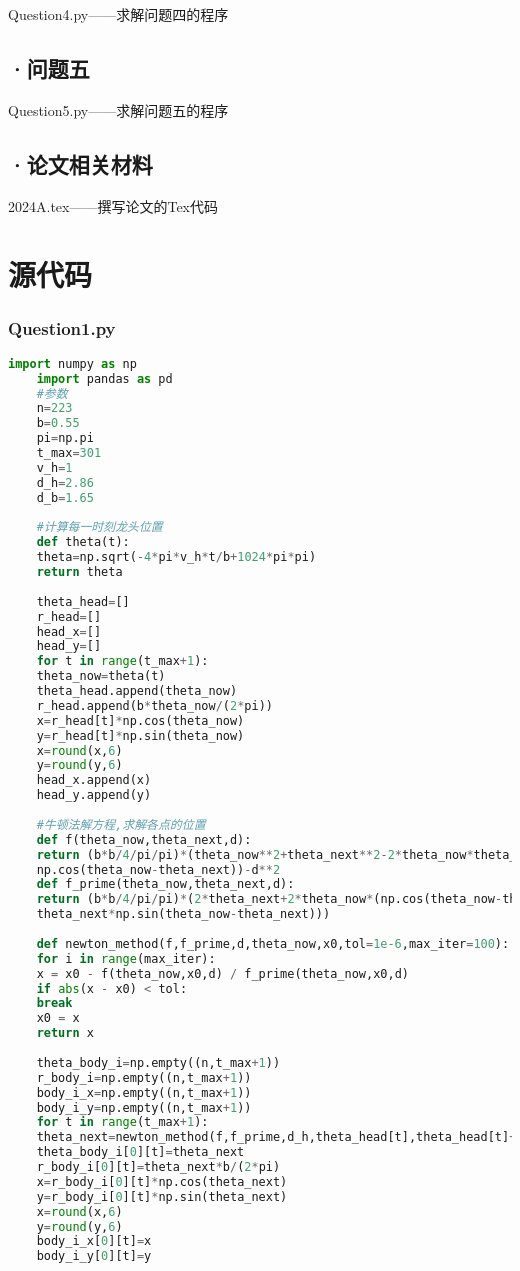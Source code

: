 \documentclass[withoutpreface,bwprint]{cumcmthesis} %
\begin{document}
	Question4.py——求解问题四的程序
	\subsection*{·问题五}
	Question5.py——求解问题五的程序
	\subsection*{·论文相关材料}
	2024A.tex——撰写论文的Tex代码
	\section{\quad 源代码}
	\subsubsection*{Question1.py}
	\begin{lstlisting}[language=Python]
	import numpy as np
	import pandas as pd
	#参数
	n=223
	b=0.55
	pi=np.pi
	t_max=301
	v_h=1
	d_h=2.86
	d_b=1.65
	
	#计算每一时刻龙头位置
	def theta(t):
	theta=np.sqrt(-4*pi*v_h*t/b+1024*pi*pi)
	return theta
	
	theta_head=[]
	r_head=[]
	head_x=[]
	head_y=[]
	for t in range(t_max+1):
	theta_now=theta(t)
	theta_head.append(theta_now)
	r_head.append(b*theta_now/(2*pi))
	x=r_head[t]*np.cos(theta_now)
	y=r_head[t]*np.sin(theta_now)
	x=round(x,6)
	y=round(y,6)
	head_x.append(x)
	head_y.append(y)
	
	#牛顿法解方程,求解各点的位置
	def f(theta_now,theta_next,d):
	return (b*b/4/pi/pi)*(theta_now**2+theta_next**2-2*theta_now*theta_next*
	np.cos(theta_now-theta_next))-d**2
	def f_prime(theta_now,theta_next,d):
	return (b*b/4/pi/pi)*(2*theta_next+2*theta_now*(np.cos(theta_now-theta_next)-
	theta_next*np.sin(theta_now-theta_next)))
	
	def newton_method(f,f_prime,d,theta_now,x0,tol=1e-6,max_iter=100):
	for i in range(max_iter):
	x = x0 - f(theta_now,x0,d) / f_prime(theta_now,x0,d)
	if abs(x - x0) < tol:
	break
	x0 = x
	return x
	
	theta_body_i=np.empty((n,t_max+1))
	r_body_i=np.empty((n,t_max+1))
	body_i_x=np.empty((n,t_max+1))
	body_i_y=np.empty((n,t_max+1))
	for t in range(t_max+1):
	theta_next=newton_method(f,f_prime,d_h,theta_head[t],theta_head[t]+pi/2)
	theta_body_i[0][t]=theta_next
	r_body_i[0][t]=theta_next*b/(2*pi)
	x=r_body_i[0][t]*np.cos(theta_next)
	y=r_body_i[0][t]*np.sin(theta_next)
	x=round(x,6)
	y=round(y,6)
	body_i_x[0][t]=x
	body_i_y[0][t]=y
	

\end{lstlisting}
\end{document}
